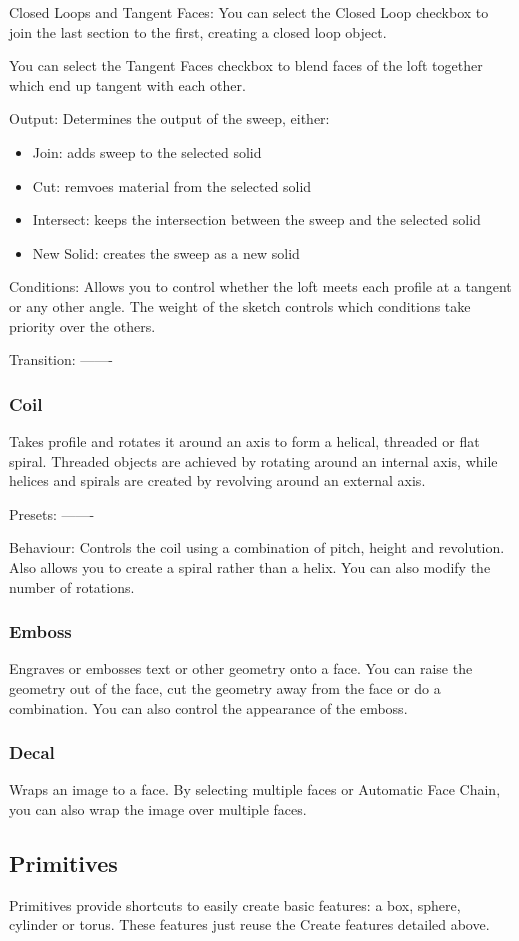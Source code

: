 Closed Loops and Tangent Faces:
You can select the Closed Loop checkbox to join the last section to the first, creating a closed loop object.

You can select the Tangent Faces checkbox to blend faces of the loft together which end up tangent with each other.

Output:
Determines the output of the sweep, either:
\begin{itemize}
    \item Join: adds sweep to the selected solid
    \item Cut: remvoes material from the selected solid
    \item Intersect: keeps the intersection between the sweep and the selected solid
    \item New Solid: creates the sweep as a new solid
\end{itemize}

Conditions:
Allows you to control whether the loft meets each profile at a tangent or any other angle. The weight of the sketch controls which conditions take priority over the others.

Transition:
-------

\subsubsection{Coil}
Takes profile and rotates it around an axis to form a helical, threaded or flat spiral. Threaded objects are achieved by rotating around an internal axis, while helices and spirals are created by revolving around an external axis.

Presets:
-------

Behaviour:
Controls the coil using a combination of pitch, height and revolution. Also allows you to create a spiral rather than a helix. You can also modify the number of rotations.

\subsubsection{Emboss}
Engraves or embosses text or other geometry onto a face. You can raise the geometry out of the face, cut the geometry away from the face or do a combination. You can also control the appearance of the emboss.

\subsubsection{Decal}
Wraps an image to a face. By selecting multiple faces or Automatic Face Chain, you can also wrap the image over multiple faces.



\subsection{Primitives}
Primitives provide shortcuts to easily create basic features: a box, sphere, cylinder or torus. These features just reuse the Create features detailed above.